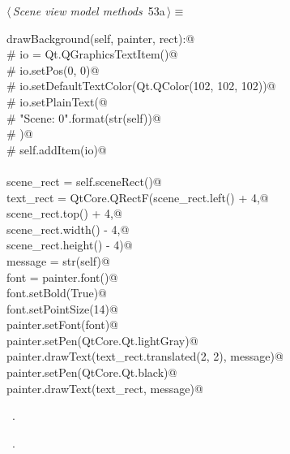 \documentclass[
    a4paper,      %
    10pt,         %
    openright,    %
    notitlepage,  %
    parskip=half, %
]{scrreprt}       %
\theoremstyle{definition}                    %
\begin{document}
\begin{flushleft} \small
\begin{minipage}{\linewidth}\label{scrap82}\raggedright\small
{} $\langle\,${\itshape Scene view model methods}\nobreak\ {\footnotesize {53a}}$\,\rangle\equiv$
\vspace{-1ex}
\begin{list}{}{} \item
\mbox{}\lstinline@def drawBackground(self, painter, rect):@\\
\mbox{}\lstinline@    # io = Qt.QGraphicsTextItem()@\\
\mbox{}\lstinline@    # io.setPos(0, 0)@\\
\mbox{}\lstinline@    # io.setDefaultTextColor(Qt.QColor(102, 102, 102))@\\
\mbox{}\lstinline@    # io.setPlainText(@\\
\mbox{}\lstinline@    #     "Scene: {0}".format(str(self))@\\
\mbox{}\lstinline@    # )@\\
\mbox{}\lstinline@    # self.addItem(io)@\\
\mbox{}\lstinline@@\\
\mbox{}\lstinline@    scene_rect = self.sceneRect()@\\
\mbox{}\lstinline@    text_rect = QtCore.QRectF(scene_rect.left()   + 4,@\\
\mbox{}\lstinline@                              scene_rect.top()    + 4,@\\
\mbox{}\lstinline@                              scene_rect.width()  - 4,@\\
\mbox{}\lstinline@                              scene_rect.height() - 4)@\\
\mbox{}\lstinline@    message = str(self)@\\
\mbox{}\lstinline@    font = painter.font()@\\
\mbox{}\lstinline@    font.setBold(True)@\\
\mbox{}\lstinline@    font.setPointSize(14)@\\
\mbox{}\lstinline@    painter.setFont(font)@\\
\mbox{}\lstinline@    painter.setPen(QtCore.Qt.lightGray)@\\
\mbox{}\lstinline@    painter.drawText(text_rect.translated(2, 2), message)@\\
\mbox{}\lstinline@    painter.setPen(QtCore.Qt.black)@\\
\mbox{}\lstinline@    painter.drawText(text_rect, message)@{\NWsep}
\end{list}
\vspace{-1.5ex}
\footnotesize
\begin{list}{}{\setlength{\itemsep}{-\parsep}\setlength{\itemindent}{-\leftmargin}}
\item \NWtxtMacroDefBy\ .
\item \NWtxtMacroRefIn\ .

\item{}
\end{list}
\end{minipage}\vspace{4ex}
\end{flushleft}
\end{document}
